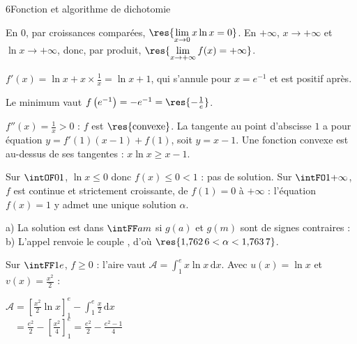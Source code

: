 \begin{corrigeBac}{6}{Fonction et algorithme de dichotomie}
\begin{questions}
  \item En $0$, par croissances comparées, $\res{\lim\limits_{x\to0}x\ln x=0}$. En $+\infty$, $x\to+\infty$ et $\ln x\to+\infty$, donc, par
    produit, $\res{\lim\limits_{x\to+\infty}f(x)=+\infty}$. 
  \item $f'(x)=\ln x+x\times\frac1x=\ln x+1$, qui s'annule pour $x=e^{-1}$ et est positif après.
\begin{center}
\begin{tableau}
\end{tableau}
\end{center}
    Le minimum vaut $f\left(e^{-1}\right)=-e^{-1}=\res{-\tfrac1e}$. 
  \item $f''(x)=\frac1x>0$ : $f$ est $\res{\text{convexe}}$. La tangente au point d'abscisse $1$ a pour équation $y=f'(1)(x-1)+f(1)$, soit
    $y=x-1$. Une fonction convexe est au-dessus de ses tangentes : $x\ln x\geq x-1$. \pts{1 pt}
\end{questions}
\begin{questions}[resume]
  \item Sur $\intOF01$, $\ln x\leq0$ donc $f(x)\leq0<1$ : pas de solution. Sur $\intFO1{+\infty}$, $f$ est continue et strictement
    croissante, de $f(1)=0$ à $+\infty$ : l'équation $f(x)=1$ y admet une unique solution $\alpha$. \pts{1 pt}
  \item a) La solution est dans $\intFF am$ si $g(a)$ et $g(m)$ sont de signes contraires : \\
    b) L'appel renvoie le couple , d'où $\res{1{,}762\,6<\alpha<1{,}763\,7}$. 
  \item Sur $\intFF1e$, $f\geq0$ : l'aire vaut $\mathcal{A}=\int_1^{e}x\ln x\,\mathrm{d}x$. Avec $u(x)=\ln x$ et $v(x)=\frac{x^{2}}{2}$ :
\begin{codecote}[0.56]
\raggedright
$\mathcal{A}=\left[\frac{x^{2}}{2}\ln x\right]_1^{e}-\int_1^{e}\frac x2\,\mathrm{d}x$\\[1mm]
$\phantom{\mathcal{A}}=\frac{e^{2}}{2}-\left[\frac{x^{2}}{4}\right]_1^{e}=\frac{e^{2}}{2}-\frac{e^{2}-1}{4}$\\[1mm]

\end{codecote}
\end{questions}
\end{corrigeBac}
